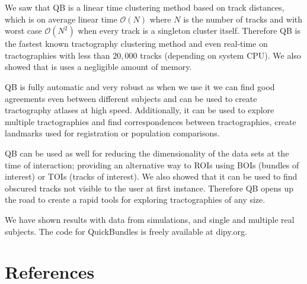 \documentclass[preprint,authoryear,a4paper,10pt,onecolumn]{elsarticle}
\begin{document}
We saw that QB is a linear time clustering method based on track
distances, which is on average linear time $\mathcal{O}(N)$ where $N$ is the
number of tracks and with worst case $\mathcal{O}(N^{2})$ when every track is a
singleton cluster itself. Therefore QB is the fastest known tractography
clustering method and even real-time on tractographies with less than
$20,000$ tracks (depending on system CPU). We also showed that is uses a
negligible amount of memory.

QB is fully automatic and very robust as when we use it we can find good
agreements even between different subjects and can be used to create
tractography atlases at high speed. Additionally, it can be used to
explore multiple tractographies and find correspondences between
tractographies, create landmarks used for registration or population
comparisons.

QB can be used as well for reducing the dimensionality of the data sets
at the time of interaction; providing an alternative way to ROIs using
BOIs (bundles of interest) or TOIs (tracks of interest). We also showed
that it can be used to find obscured tracks not visible to the user
at first instance. Therefore QB opens up the road to create a rapid
tools for exploring tractographies of any size.

We have shown results with data from simulations, and single and
multiple real subjects. The code for QuickBundles is freely available at
dipy.org.

\section{References}

%


\end{document}
